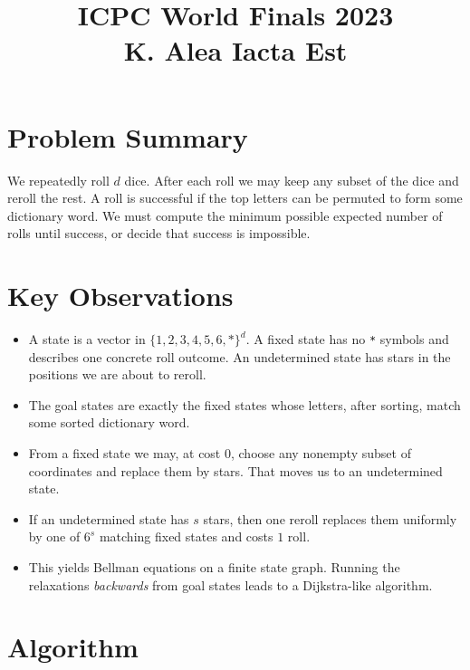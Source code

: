 \documentclass[11pt]{article}
\title{ICPC World Finals 2023\\K. Alea Iacta Est}
\author{}
\date{}
\begin{document}
\maketitle

\section*{Problem Summary}

We repeatedly roll $d$ dice. After each roll we may keep any subset of the dice and reroll the rest. A
roll is successful if the top letters can be permuted to form some dictionary word. We must compute the
minimum possible expected number of rolls until success, or decide that success is impossible.

\section*{Key Observations}

\begin{itemize}[leftmargin=*]
    \item A state is a vector in $\{1,2,3,4,5,6,*\}^d$. A fixed state has no \texttt{*} symbols and describes
    one concrete roll outcome. An undetermined state has stars in the positions we are about to reroll.
    \item The goal states are exactly the fixed states whose letters, after sorting, match some sorted
    dictionary word.
    \item From a fixed state we may, at cost $0$, choose any nonempty subset of coordinates and replace
    them by stars. That moves us to an undetermined state.
    \item If an undetermined state has $s$ stars, then one reroll replaces them uniformly by one of $6^s$
    matching fixed states and costs $1$ roll.
    \item This yields Bellman equations on a finite state graph. Running the relaxations \emph{backwards}
    from goal states leads to a Dijkstra-like algorithm.
\end{itemize}

\section*{Algorithm}
\end{document}
